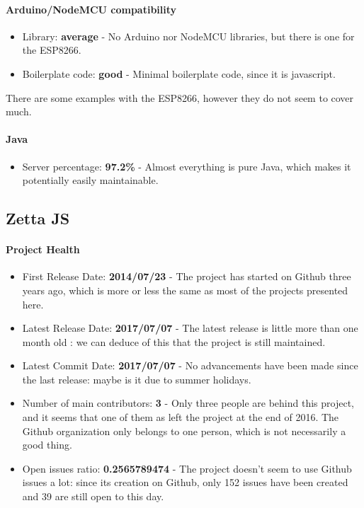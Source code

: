 \documentclass{article}
\begin{document}
\paragraph{Arduino/NodeMCU compatibility}

\begin{itemize}
\item Library: \textbf{average} - No Arduino nor NodeMCU libraries, but there is one for the ESP8266.
\item Boilerplate code: \textbf{good} - Minimal boilerplate code, since it is javascript.
\end{itemize}

There are some examples with the ESP8266, however they do not seem to cover much.

\paragraph{Java} 

\begin{itemize}
\item Server percentage: \textbf{97.2\%} - Almost everything is pure Java, which makes it potentially easily maintainable.
\end{itemize}

\subsection{Zetta JS}

\paragraph{Project Health}

\begin{itemize}
\item First Release Date: \textbf{2014/07/23} - The project has started on Github three years ago, which is more or less the same as most of the projects presented here.
\item Latest Release Date: \textbf{2017/07/07} - The latest release is little more than one month old : we can deduce of this that the project is still maintained.
\item Latest Commit Date: \textbf{2017/07/07} - No advancements have been made since the last release: maybe is it due to summer holidays.
\item Number of main contributors: \textbf{3} - Only three people are behind this project, and it seems that one of them as left the project at the end of 2016. The Github organization only belongs to one person, which is not necessarily a good thing.
\item Open issues ratio: \textbf{0.2565789474} - The project doesn't seem to use Github issues a lot: since its creation on Github, only 152 issues have been created and 39 are still open to this day.
\end{itemize}
\end{document}
